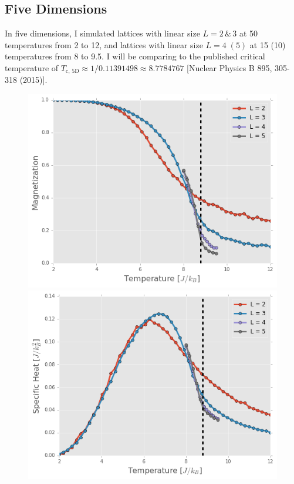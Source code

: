 \documentclass[11pt, oneside]{article}
\begin{document}
\subsection{Five Dimensions}
In five dimensions, I simulated lattices with linear size $L=2\,\&\,3$ at 50 temperatures from 2 to 12, and lattices with linear size $L=4\;(5)$ at 15 (10) temperatures from 8 to 9.5. I will be comparing to the published critical temperature of $T_{\text{c, 5D}}\approx1/0.11391498\approx8.7784767$ [Nuclear Physics B 895, 305-318 (2015)].
\begin{figure}[H]
\begin{minipage}{0.47\textwidth}
    \includegraphics[width=\linewidth]{img/5D/mag}
    \end{minipage}
    \hspace{\fill} %
    \begin{minipage}{0.47\textwidth}
    \includegraphics[width=\linewidth]{img/5D/C}
    \end{minipage}
    

\end{figure}
\end{document}
